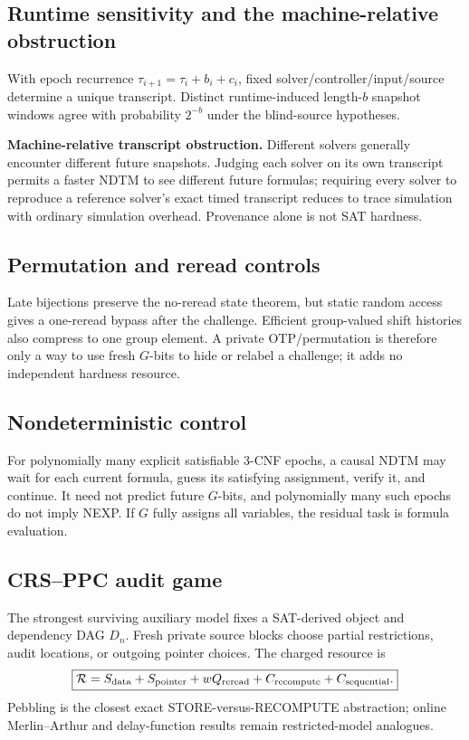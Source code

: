 \documentclass[11pt]{article}
\begin{document}
\subsection{Runtime sensitivity and the machine-relative obstruction}
With epoch recurrence \(\tau_{i+1}=\tau_i+b_i+c_i\), fixed solver/controller/input/source
determine a unique transcript. Distinct runtime-induced length-\(b\) snapshot windows agree
with probability \(2^{-b}\) under the blind-source hypotheses.

\begin{warningbox}
\textbf{Machine-relative transcript obstruction.} Different solvers generally encounter different
future snapshots. Judging each solver on its own transcript permits a faster NDTM to see different
future formulas; requiring every solver to reproduce a reference solver's exact timed transcript
reduces to trace simulation with ordinary simulation overhead. Provenance alone is not SAT hardness.
\end{warningbox}

\subsection{Permutation and reread controls}
Late bijections preserve the no-reread state theorem, but static random access gives a one-reread
bypass after the challenge. Efficient group-valued shift histories also compress to one group
element. A private OTP/permutation is therefore only a way to use fresh \(G\)-bits to hide or
relabel a challenge; it adds no independent hardness resource.

\subsection{Nondeterministic control}
\begin{warningbox}
For polynomially many explicit satisfiable 3-CNF epochs, a causal NDTM may wait for each current
formula, guess its satisfying assignment, verify it, and continue. It need not predict future
\(G\)-bits, and polynomially many such epochs do not imply NEXP. If \(G\) fully assigns
all variables, the residual task is formula evaluation.
\end{warningbox}

\subsection{CRS--PPC audit game}
The strongest surviving auxiliary model fixes a SAT-derived object and dependency DAG \(D_n\).
Fresh private source blocks choose partial restrictions, audit locations, or outgoing pointer
choices. The charged resource is
\[
\boxed{\mathcal R=S_{\rm data}+S_{\rm pointer}+wQ_{\rm reread}+C_{\rm recompute}+C_{\rm sequential}.}
\]
Pebbling is the closest exact STORE-versus-RECOMPUTE abstraction; online Merlin--Arthur and
delay-function results remain restricted-model analogues.
\end{document}
